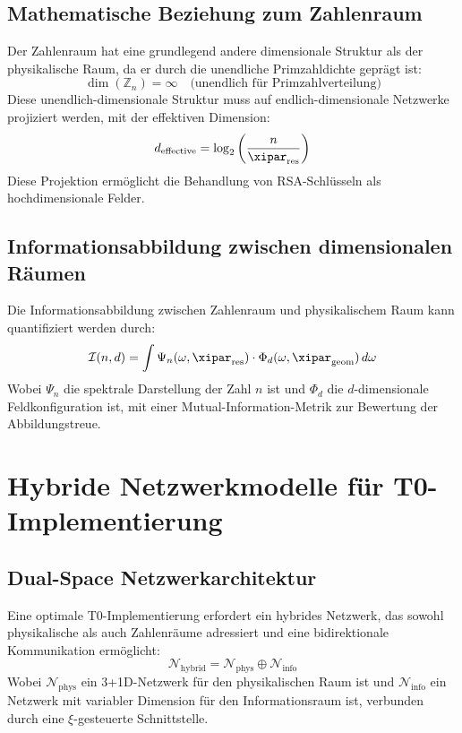 \subsection{Mathematische Beziehung zum Zahlenraum}
\label{subsec:zahlenraum_relation}
Der Zahlenraum hat eine grundlegend andere dimensionale Struktur als der physikalische Raum, da er durch die unendliche Primzahldichte geprägt ist:
\begin{equation}
	\dim(\mathbb{Z}_n) = \infty \quad \text{(unendlich für Primzahlverteilung)}
\end{equation}
Diese unendlich-dimensionale Struktur muss auf endlich-dimensionale Netzwerke projiziert werden, mit der effektiven Dimension:
\begin{equation}
	d_{\text{effective}} = \log_2\left(\frac{n}{\xipar_{\text{res}}}\right)
\end{equation}
Diese Projektion ermöglicht die Behandlung von RSA-Schlüsseln als hochdimensionale Felder.
\subsection{Informationsabbildung zwischen dimensionalen Räumen}
\label{subsec:information_mapping}
Die Informationsabbildung zwischen Zahlenraum und physikalischem Raum kann quantifiziert werden durch:
\begin{equation}
	\mathcal{I}(n, d) = \int \Psi_n(\omega, \xipar_{\text{res}}) \cdot \Phi_d(\omega, \xipar_{\text{geom}}) \, d\omega
\end{equation}
Wobei $\Psi_n$ die spektrale Darstellung der Zahl $n$ ist und $\Phi_d$ die $d$-dimensionale Feldkonfiguration ist, mit einer Mutual-Information-Metrik zur Bewertung der Abbildungstreue.
\section{Hybride Netzwerkmodelle für T0-Implementierung}
\label{sec:hybrid_models}
\subsection{Dual-Space Netzwerkarchitektur}
\label{subsec:dual_space}
Eine optimale T0-Implementierung erfordert ein hybrides Netzwerk, das sowohl physikalische als auch Zahlenräume adressiert und eine bidirektionale Kommunikation ermöglicht:
\begin{equation}
	\mathcal{N}_{\text{hybrid}} = \mathcal{N}_{\text{phys}} \oplus \mathcal{N}_{\text{info}}
\end{equation}
Wobei $\mathcal{N}_{\text{phys}}$ ein 3+1D-Netzwerk für den physikalischen Raum ist und $\mathcal{N}_{\text{info}}$ ein Netzwerk mit variabler Dimension für den Informationsraum ist, verbunden durch eine $\xi$-gesteuerte Schnittstelle.
